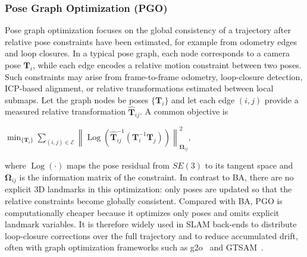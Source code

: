 \subsubsection{Pose Graph Optimization (PGO)}
Pose graph optimization focuses on the global consistency of a trajectory after relative pose constraints have been estimated, for example from odometry edges and loop closures. In a typical pose graph, each node corresponds to a camera pose $\mathbf{T}_i$, while each edge encodes a relative motion constraint between two poses. Such constraints may arise from frame-to-frame odometry, loop-closure detection, ICP-based alignment, or relative transformations estimated between local submaps. Let the graph nodes be poses $\{\mathbf{T}_i\}$ and let each edge $(i,j)$ provide a measured relative transformation $\hat{\mathbf{T}}_{ij}$. A common objective is
\begin{center}
    $\displaystyle \min_{\{\mathbf{T}_i\}} \sum_{(i,j)\in\mathcal{E}} \left\| \operatorname{Log}\!\left(\hat{\mathbf{T}}_{ij}^{-1}\left(\mathbf{T}_i^{-1}\mathbf{T}_j\right)\right) \right\|_{\mathbf{\Omega}_{ij}}^2, $
\end{center}
where $\operatorname{Log}(\cdot)$ maps the pose residual from $SE(3)$ to its tangent space and $\mathbf{\Omega}_{ij}$ is the information matrix of the constraint. In contrast to BA, there are no explicit 3D landmarks in this optimization: only poses are updated so that the relative constraints become globally consistent. Compared with BA, PGO is computationally cheaper because it optimizes only poses and omits explicit landmark variables. It is therefore widely used in SLAM back-ends to distribute loop-closure corrections over the full trajectory and to reduce accumulated drift, often with graph optimization frameworks such as g2o~\cite{kummerle2011g2o} and GTSAM~\cite{dellaert2012gtsam}.

